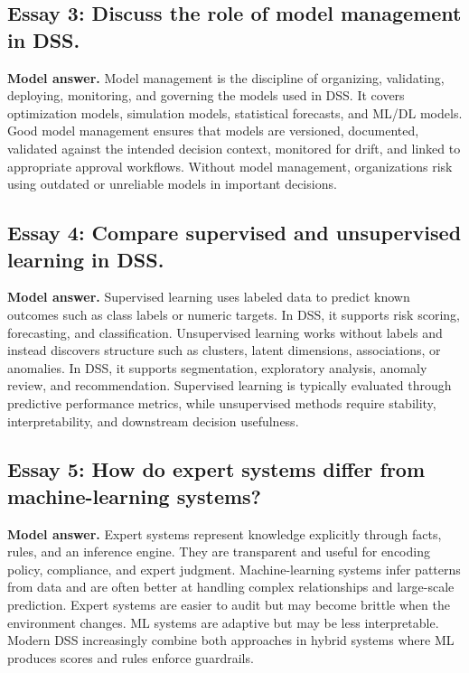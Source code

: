 \subsection*{Essay 3: Discuss the role of model management in DSS.}
\textbf{Model answer.}
Model management is the discipline of organizing, validating, deploying,
monitoring, and governing the models used in DSS. It covers optimization
models, simulation models, statistical forecasts, and ML/DL models. Good model
management ensures that models are versioned, documented, validated against the
intended decision context, monitored for drift, and linked to appropriate
approval workflows. Without model management, organizations risk using outdated
or unreliable models in important decisions.

\subsection*{Essay 4: Compare supervised and unsupervised learning in DSS.}
\textbf{Model answer.}
Supervised learning uses labeled data to predict known outcomes such as class
labels or numeric targets. In DSS, it supports risk scoring, forecasting, and
classification. Unsupervised learning works without labels and instead
discovers structure such as clusters, latent dimensions, associations, or
anomalies. In DSS, it supports segmentation, exploratory analysis, anomaly
review, and recommendation. Supervised learning is typically evaluated through
predictive performance metrics, while unsupervised methods require stability,
interpretability, and downstream decision usefulness.

\subsection*{Essay 5: How do expert systems differ from machine-learning systems?}
\textbf{Model answer.}
Expert systems represent knowledge explicitly through facts, rules, and an
inference engine. They are transparent and useful for encoding policy,
compliance, and expert judgment. Machine-learning systems infer patterns from
data and are often better at handling complex relationships and large-scale
prediction. Expert systems are easier to audit but may become brittle when the
environment changes. ML systems are adaptive but may be less interpretable.
Modern DSS increasingly combine both approaches in hybrid systems where ML
produces scores and rules enforce guardrails.

